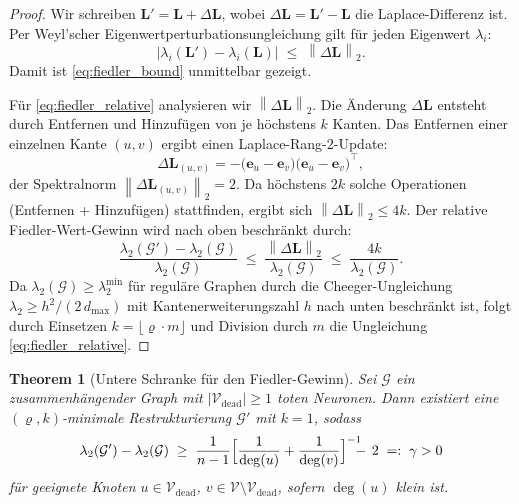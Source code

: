 \documentclass[12pt, a4paper, openany]{report}
\newtheorem{theorem}{Theorem}[chapter]
\newcommand{\calG}{\mathcal{G}}
\newcommand{\calV}{\mathcal{V}}
\newcommand{\norms}[1]{\left\|#1\right\|}
\newcommand{\abs}[1]{\left|#1\right|}
\begin{document}
\begin{proof}
Wir schreiben $\bm{L}' = \bm{L} + \Delta\bm{L}$, wobei $\Delta\bm{L} =
\bm{L}' - \bm{L}$ die Laplace-Differenz ist.  Per Weyl'scher
Eigenwertperturbationsungleichung gilt für jeden Eigenwert $\lambda_i$:
\begin{equation}
  \label{eq:weyl}
  \abs{\lambda_i(\bm{L}') - \lambda_i(\bm{L})} \;\leq\; \norms{\Delta\bm{L}}_2.
\end{equation}
Damit ist \eqref{eq:fiedler_bound} unmittelbar gezeigt.

Für \eqref{eq:fiedler_relative} analysieren wir $\norms{\Delta\bm{L}}_2$.
Die Änderung $\Delta\bm{L}$ entsteht durch Entfernen und Hinzufügen von
je höchstens $k$ Kanten.  Das Entfernen einer einzelnen Kante
$(u,v)$ ergibt einen Laplace-Rang-$2$-Update:
\[
  \Delta\bm{L}_{(u,v)}
  = -\bigl(\bm{e}_u - \bm{e}_v\bigr)\bigl(\bm{e}_u - \bm{e}_v\bigr)^\top,
\]
der Spektralnorm $\norms{\Delta\bm{L}_{(u,v)}}_2 = 2$.  Da höchstens
$2k$ solche Operationen (Entfernen + Hinzufügen) stattfinden, ergibt
sich $\norms{\Delta\bm{L}}_2 \leq 4k$.  Der relative Fiedler-Wert-Gewinn
wird nach oben beschränkt durch:
\[
  \frac{\lambda_2(\calG') - \lambda_2(\calG)}{\lambda_2(\calG)}
  \;\leq\;
  \frac{\norms{\Delta\bm{L}}_2}{\lambda_2(\calG)}
  \;\leq\;
  \frac{4k}{\lambda_2(\calG)}.
\]
Da $\lambda_2(\calG) \geq \lambda_2^{\min}$ für reguläre Graphen durch
die Cheeger-Ungleichung $\lambda_2 \geq h^2/(2\,d_{\max})$ mit
Kantenerweiterungszahl $h$ nach unten beschränkt ist, folgt durch
Einsetzen $k = \lfloor\varrho\cdot m\rfloor$ und Division durch $m$
die Ungleichung \eqref{eq:fiedler_relative}.
\end{proof}

\begin{theorem}[Untere Schranke für den Fiedler-Gewinn]
\label{thm:fiedler_lower}
Sei $\calG$ ein zusammenhängender Graph mit $|\calV_{\mathrm{dead}}| \geq 1$
toten Neuronen.  Dann existiert eine $(\varrho, k)$-minimale Restrukturierung
$\calG'$ mit $k = 1$, sodass
\begin{equation}
  \label{eq:fiedler_lower}
  \lambda_2(\calG') - \lambda_2(\calG)
  \;\geq\;
  \frac{1}{n-1}
  \Bigl[
    \frac{1}{\deg(u)} + \frac{1}{\deg(v)}
  \Bigr]^{-1} \!\!\!\!- \,2
  \;=:\; \gamma > 0
\end{equation}
für geeignete Knoten $u \in \calV_{\mathrm{dead}}$, $v \in \calV \setminus \calV_{\mathrm{dead}}$,
sofern $\deg(u)$ klein ist.
\end{theorem}
\end{document}
